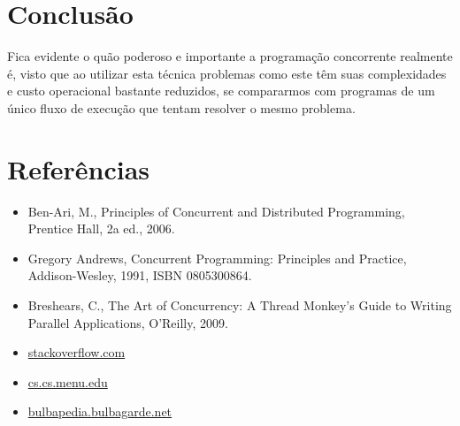 \documentclass{article}
\begin{document}
\section{Conclusão}
Fica evidente o quão poderoso e importante a programação concorrente realmente é, visto que ao utilizar esta técnica problemas como este têm suas complexidades e custo operacional bastante reduzidos, se compararmos com programas de um único fluxo de execução que tentam resolver o mesmo problema.

\section{Referências}
\begin{itemize}
        \item Ben-Ari, M., Principles of Concurrent and Distributed Programming, Prentice Hall, 2a ed., 2006.
        \item Gregory Andrews, Concurrent Programming: Principles and Practice, Addison-Wesley, 1991, ISBN 0805300864.
        \item Breshears, C., The Art of Concurrency: A Thread Monkey’s Guide to Writing Parallel Applications, O’Reilly, 2009.
        \item \href{https://stackoverflow.com/questions/27294954/how-to-use-sem-trywait}{stackoverflow.com}
        \item \href{https://www.cs.cmu.edu/afs/cs/academic/class/15492-f07/www/pthreads.html}{cs.cs.menu.edu}
        \item \href{https://bulbapedia.bulbagarden.net/wiki/Sableye_(Pok%C3%A9mon)}{bulbapedia.bulbagarde.net}
\end{itemize}
\end{document}
